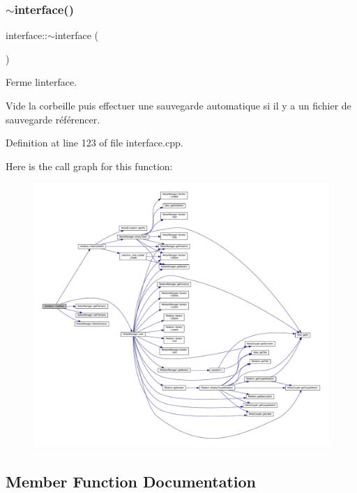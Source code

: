 \subsubsection{\texorpdfstring{$\sim$interface()}{~interface()}}
{\footnotesize\ttfamily interface\+::$\sim$interface (\begin{DoxyParamCaption}{ }\end{DoxyParamCaption})}



Ferme l\textquotesingle{}interface. 

Vide la corbeille puis effectuer une sauvegarde automatique si il y a un fichier de sauvegarde référencer. 

Definition at line 123 of file interface.\+cpp.

Here is the call graph for this function\+:\nopagebreak
\begin{figure}[H]
\begin{center}
\leavevmode
\includegraphics[width=350pt]{classinterface_a8511f28c5bc5d3c24a24e9aaef4db502_cgraph}
\end{center}
\end{figure}


\subsection{Member Function Documentation}
\mbox{\label{classinterface_a287c8a46ece12a94540a190b96b911c9}} 
